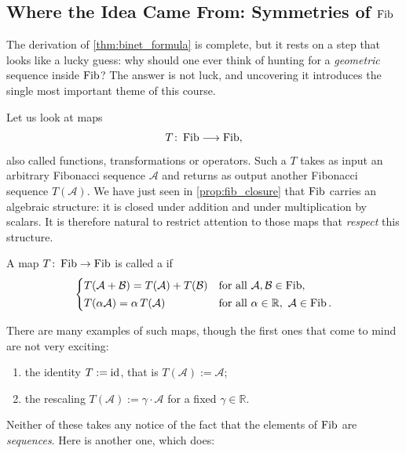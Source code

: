 \subsection{Where the Idea Came From: Symmetries of \texorpdfstring{$\operatorname{Fib}$}{Fib}}

The derivation of \cref{thm:binet_formula} is complete, but it rests on a step that
looks like a lucky guess: why should one ever think of hunting for a \emph{geometric}
sequence inside $\operatorname{Fib}$? The answer is not luck, and uncovering it introduces the single
most important theme of this course.

Let us look at maps
\[
T \colon \operatorname{Fib} \longrightarrow \operatorname{Fib},
\]
also called functions, transformations or operators. Such a $T$ takes as input an
arbitrary Fibonacci sequence $\mathcal{A}$ and returns as output another Fibonacci
sequence $T(\mathcal{A})$. We have just seen in \cref{prop:fib_closure} that $\operatorname{Fib}$
carries an algebraic structure: it is closed under addition and under multiplication
by scalars. It is therefore natural to restrict attention to those maps that
\emph{respect} this structure.

\begin{definition}
\label{def:linear_map_fib}
A map $T \colon \operatorname{Fib} \to \operatorname{Fib}$ is called a  if
\begin{equation} \label{eq:fib_linearity}
\begin{cases}
T(\mathcal{A} + \mathcal{B}) = T(\mathcal{A}) + T(\mathcal{B}) & \text{for all } \mathcal{A}, \mathcal{B} \in \operatorname{Fib}, \\[0.4ex]
T(\alpha \mathcal{A}) = \alpha \, T(\mathcal{A}) & \text{for all } \alpha \in \mathbb{R}, \ \mathcal{A} \in \operatorname{Fib}.
\end{cases}
\end{equation}
\end{definition}

There are many examples of such maps, though the first ones that come to mind are not
very exciting:
\begin{enumerate}
    \item the identity $T := \operatorname{id}$, that is $T(\mathcal{A}) := \mathcal{A}$;
    \item the rescaling $T(\mathcal{A}) := \gamma \cdot \mathcal{A}$ for a fixed $\gamma \in \mathbb{R}$.
\end{enumerate}
Neither of these takes any notice of the fact that the elements of $\operatorname{Fib}$ are
\textit{sequences}. Here is another one, which does:

